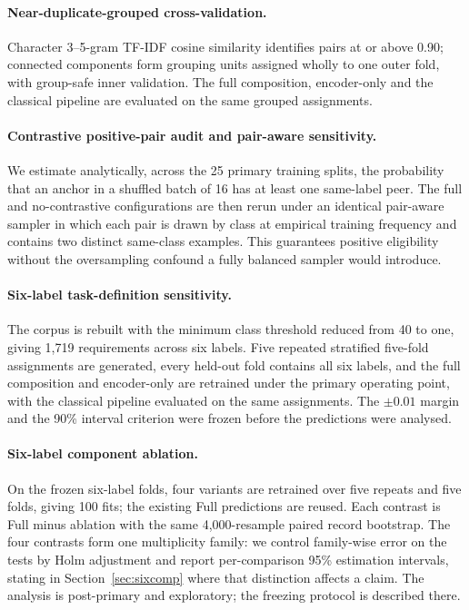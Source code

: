 \documentclass[11pt,a4paper]{article}
\begin{document}
\paragraph{Near-duplicate-grouped cross-validation.} Character 3--5-gram TF-IDF cosine similarity
identifies pairs at or above 0.90; connected components form grouping units assigned wholly to one outer
fold, with group-safe inner validation. The full composition, encoder-only and the classical pipeline are
evaluated on the same grouped assignments.

\paragraph{Contrastive positive-pair audit and pair-aware sensitivity.} We estimate analytically, across
the 25 primary training splits, the probability that an anchor in a shuffled batch of 16 has at least one
same-label peer. The full and no-contrastive configurations are then rerun under an identical pair-aware
sampler in which each pair is drawn by class at empirical training frequency and contains two distinct
same-class examples. This guarantees positive eligibility without the oversampling confound a fully
balanced sampler would introduce.

\paragraph{Six-label task-definition sensitivity.} The corpus is rebuilt with the minimum class threshold
reduced from 40 to one, giving 1,719 requirements across six labels. Five repeated stratified five-fold
assignments are generated, every held-out fold contains all six labels, and the full composition and
encoder-only are retrained under the primary operating point, with the classical pipeline evaluated on the
same assignments. The $\pm 0.01$ margin and the 90\% interval criterion were frozen before the predictions
were analysed.

\paragraph{Six-label component ablation.} On the frozen six-label folds, four variants are retrained over
five repeats and five folds, giving 100 fits; the existing Full predictions are reused. Each contrast is
Full minus ablation with the same 4,000-resample paired record bootstrap. The four contrasts form one
multiplicity family: we control family-wise error on the tests by Holm adjustment and report
per-comparison 95\% estimation intervals, stating in Section~\ref{sec:sixcomp} where that distinction
affects a claim. The analysis is post-primary and exploratory; the freezing protocol is described there.
\end{document}
